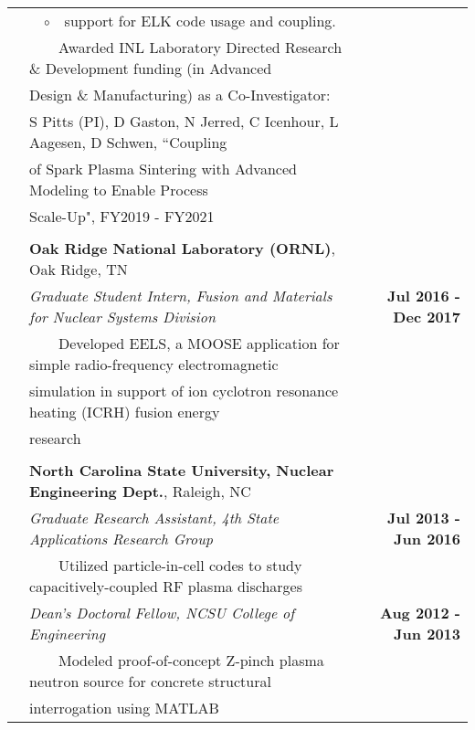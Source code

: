 \documentclass{article}
\newcommand{\tabitem}{~~\textbullet~~}
\newcommand{\tabitemii}{~~$\circ$~~}
\begin{document}
\begin{tabularx}{\textwidth}{l X r}
		& \hspace{1.5em} \tabitemii support for ELK code usage and coupling. & \\
	& \tabitem Awarded INL Laboratory Directed Research \& Development funding (in Advanced & \\
	& \hspace{1.5em} Design \& Manufacturing) as a Co-Investigator: & \\
	& \hspace{2.5em} S Pitts (PI), D Gaston, N Jerred, C Icenhour, L Aagesen, D Schwen, ``Coupling & \\
	& \hspace{2.5em} of Spark Plasma Sintering with Advanced Modeling to Enable Process & \\
	& \hspace{2.5em} Scale-Up", FY2019 - FY2021 & \\
	& & \\
	& \textbf{Oak Ridge National Laboratory (ORNL)}, Oak Ridge, TN & \\
	& \textit{Graduate Student Intern, Fusion and Materials for Nuclear Systems Division} & \textbf{Jul 2016 - Dec 2017} \\
	& \tabitem Developed EELS, a MOOSE application for simple radio-frequency electromagnetic & \\
	& \hspace{1.5em} simulation in support of ion cyclotron resonance heating (ICRH) fusion energy & \\
	& \hspace{1.5em} research & \\
	& & \\
	& \textbf{North Carolina State University, Nuclear Engineering Dept.}, Raleigh, NC & \\
	& \textit{Graduate Research Assistant, 4th State Applications Research Group} & \textbf{Jul 2013 - Jun 2016} \\
	& \tabitem Utilized particle-in-cell codes to study capacitively-coupled RF plasma discharges & \\
	& \textit{Dean's Doctoral Fellow, NCSU College of Engineering} & \textbf{Aug 2012 - Jun 2013} \\
	& \tabitem Modeled proof-of-concept Z-pinch plasma neutron source for concrete structural & \\
	& \hspace{1.5em} interrogation using MATLAB & \\
\end{tabularx}
\end{document}
